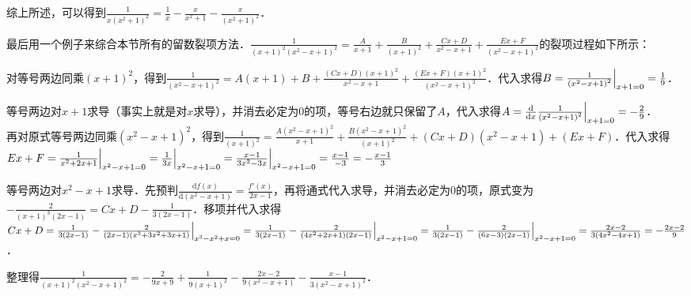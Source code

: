 \documentclass{ctexbook}
\newcommand*{\dif}{\mathop{}\!\mathrm{d}}
\begin{document}
综上所述，可以得到$\frac{1}{x\left(x^{2}+1\right)^{2}}=\frac{1}{x}-\frac{x}{x^{2}+1}-\frac{x}{\left(x^{2}+1\right)^{2}}$．\par
最后用一个例子来综合本节所有的留数裂项方法．$\frac{1}{\left(x+1\right)^{2}\left(x^{2}-x+1\right)^{2}}=\frac{A}{x+1}+\frac{B}{\left(x+1\right)^{2}}+\frac{Cx+D}{x^{2}-x+1}+\frac{Ex+F}{\left(x^{2}-x+1\right)^{2}}$的裂项过程如下所示：\par
对等号两边同乘$\left(x+1\right)^{2}$，得到$\frac{1}{\left(x^{2}-x+1\right)^{2}}=A\left(x+1\right)+B+\frac{\left(Cx+D\right)\left(x+1\right)^{2}}{x^{2}-x+1}+\frac{\left(Ex+F\right)\left(x+1\right)^{2}}{\left(x^{2}-x+1\right)^{2}}$．代入求得$B=\frac{1}{\left(x^{2}-x+1\right)^{2}}\Big{|}_{x+1=0}=\frac{1}{9}$．\par
等号两边对$x+1$求导（事实上就是对$x$求导），并消去必定为$0$的项，等号右边就只保留了$A$，代入求得$A=\frac{\mathrm{d}}{\dif{x}}\frac{1}{\left(x^{2}-x+1\right)^{2}}\Big{|}_{x+1=0}=-\frac{2}{9}$．\\
再对原式等号两边同乘$\left(x^{2}-x+1\right)^{2}$，得到$\frac{1}{\left(x+1\right)^{2}}=\frac{A\left(x^{2}-x+1\right)^{2}}{x+1}+\frac{B\left(x^{2}-x+1\right)^{2}}{\left(x+1\right)^{2}}+\left(Cx+D\right)\left(x^{2}-x+1\right)+\left(Ex+F\right)$．代入求得$Ex+F=\frac{1}{x^{2}+2x+1}\Big{|}_{x^{2}-x+1=0}=\frac{1}{3x}\Big{|}_{x^{2}-x+1=0}=\frac{x-1}{3x^{2}-3x}\Big{|}_{x^{2}-x+1=0}=\frac{x-1}{-3}=-\frac{x-1}{3}$\par
等号两边对$x^{2}-x+1$求导．先预判$\frac{\mathrm{d}f\left(x\right)}{\mathrm{d}\left(x^{2}-x+1\right)}=\frac{f'\left(x\right)}{2x-1}$，再将通式代入求导，并消去必定为$0$的项，原式变为$-\frac{2}{\left(x+1\right)^{3}\left(2x-1\right)}=Cx+D-\frac{1}{3\left(2x-1\right)}$．移项并代入求得$Cx+D=\frac{1}{3\left(2x-1\right)}-\frac{2}{\left(2x-1\right)\left(x^{3}+3x^{2}+3x+1\right)}\Big{|}_{x^{3}-x^{2}+x=0}\\=\frac{1}{3\left(2x-1\right)}-\frac{2}{\left(4x^{2}+2x+1\right)\left(2x-1\right)}\Big{|}_{x^{2}-x+1=0}=\frac{1}{3\left(2x-1\right)}-\frac{2}{\left(6x-3\right)\left(2x-1\right)}\Big{|}_{x^{2}-x+1=0}=\frac{2x-2}{3\left(4x^{2}-4x+1\right)}=-\frac{2x-2}{9}$．\par
整理得$\frac{1}{\left(x+1\right)^{2}\left(x^{2}-x+1\right)^{2}}=-\frac{2}{9x+9}+\frac{1}{9\left(x+1\right)^{2}}-\frac{2x-2}{9\left(x^{2}-x+1\right)}-\frac{x-1}{3\left(x^{2}-x+1\right)^{2}}$．\par
\end{document}
